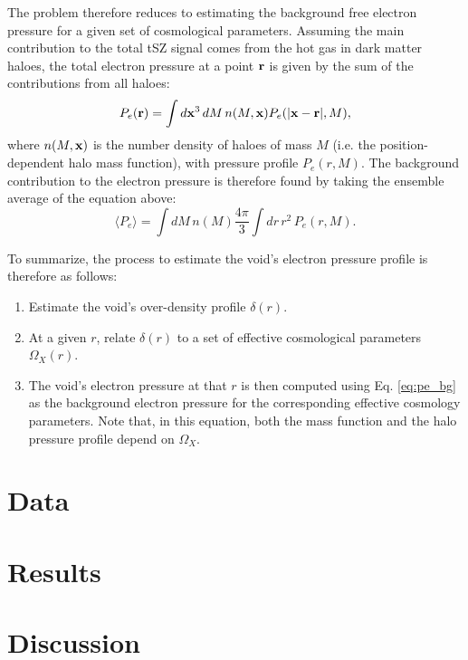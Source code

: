 \documentclass[twocolumn,amsfont,amssymb,amsmath, showpacs,balancelastpage, nofootinbib]{revtex4-1}
\begin{document}
    The problem therefore reduces to estimating the background free electron pressure for a given set of
    cosmological parameters. Assuming the main contribution to the total tSZ signal comes from the hot gas in
    dark matter haloes, the total electron pressure at a point ${\bf r}$ is given by the sum of the contributions
    from all haloes:
    \begin{align}
      P_e({\bf r})=\int d{\bf x}^3\,dM\,n(M,{\bf x})P_e(|{\bf x}-{\bf r}|,M),
    \end{align}
    where $n(M,{\bf x})$ is the number density of haloes of mass $M$ (i.e. the position-dependent halo mass
    function), with pressure profile $P_e(r,M)$. The background contribution to the electron pressure is
    therefore found by taking the ensemble average of the equation above:
    \begin{equation}\label{eq:pe_bg}
      \langle P_e \rangle=\int dM\,n(M)\frac{4\pi}{3}\int dr\,r^2\,P_e(r,M).
    \end{equation}
    
    To summarize, the process to estimate the void's electron pressure profile is therefore as follows:
    \begin{enumerate}
      \item Estimate the void's over-density profile $\delta(r)$.
      \item At a given $r$, relate $\delta(r)$ to a set of effective cosmological parameters $\Omega_X(r)$.
      \item The void's electron pressure at that $r$ is then computed using Eq. \ref{eq:pe_bg} as the
            background electron pressure for the corresponding effective cosmology parameters. Note that,
            in this equation, both the mass function and the halo pressure profile depend on $\Omega_X$.
    \end{enumerate}




  \section{Data}\label{sec:data}
    \lipsum[3]

  \section{Results}\label{sec:results}
    \lipsum[4]

  \section{Discussion}\label{sec:discussion}
    \lipsum[4]
  
\end{document}

